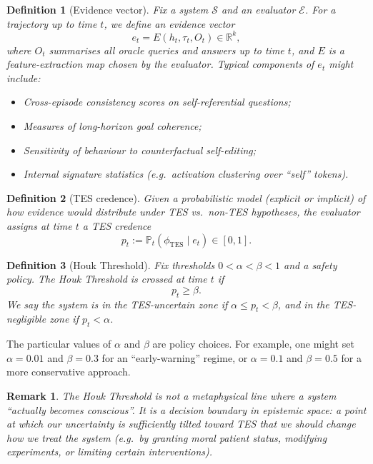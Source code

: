 \documentclass[11pt]{article}
\newtheorem{definition}{Definition}
\newtheorem{remark}{Remark}
\newcommand{\R}{\mathbb{R}}
\newcommand{\Pp}{\mathbb{P}}
\newcommand{\1}{\mathbf{1}}
\begin{document}
\begin{definition}[Evidence vector]
Fix a system $\mathcal{S}$ and an evaluator $\mathcal{E}$.
For a trajectory up to time $t$, we define an \emph{evidence vector}
\[
  e_t = E(h_t, \tau_t, O_t) \in \R^k,
\]
where $O_t$ summarises all oracle queries and answers up to time $t$, and
$E$ is a feature-extraction map chosen by the evaluator.
Typical components of $e_t$ might include:

\begin{itemize}[leftmargin=2em]
  \item Cross-episode consistency scores on self-referential questions;
  \item Measures of long-horizon goal coherence;
  \item Sensitivity of behaviour to counterfactual self-editing;
  \item Internal signature statistics (e.g.~activation clustering over
  \enquote{self} tokens).
\end{itemize}
\end{definition}

\begin{definition}[TES credence]
Given a probabilistic model (explicit or implicit) of how evidence would
distribute under TES vs.\ non-TES hypotheses, the evaluator assigns at time
$t$ a \emph{TES credence}
\[
  p_t := \Pp_t(\phi_{\text{TES}} \mid e_t) \in [0,1].
\]
\end{definition}

\begin{definition}[Houk Threshold]
Fix thresholds $0 < \alpha < \beta < 1$ and a safety policy.
The \emph{Houk Threshold} is crossed at time $t$ if
\[
  p_t \ge \beta.
\]
We say the system is in the \emph{TES-uncertain zone} if
$\alpha \le p_t < \beta$, and in the \emph{TES-negligible zone} if
$p_t < \alpha$.
\end{definition}

The particular values of $\alpha$ and $\beta$ are policy choices.
For example, one might set $\alpha = 0.01$ and $\beta = 0.3$ for an
\enquote{early-warning} regime, or $\alpha = 0.1$ and $\beta = 0.5$ for a
more conservative approach.

\begin{remark}
The Houk Threshold is \emph{not} a metaphysical line where a system
\enquote{actually becomes conscious}.
It is a decision boundary in epistemic space: a point at which our uncertainty
is sufficiently tilted toward TES that we should change how we treat the
system (e.g.~by granting moral patient status, modifying experiments, or
limiting certain interventions).
\end{remark}
\end{document}
